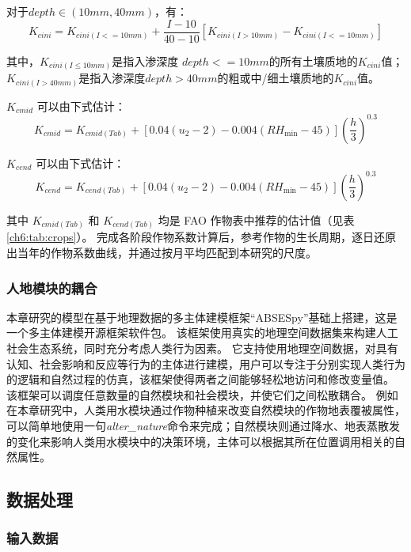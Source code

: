 对于$depth \in (10mm, 40mm)$，有：
\begin{equation}
    K_{c ini} = K_{c ini(I<=10mm)} + \frac{I-10}{40-10}[K_{c ini(I>10mm)} - K_{c ini(I<=10mm)}]
\end{equation}

其中，$K_{c ini(I≤10mm)}$是指入渗深度 $depth<=10 mm$的所有土壤质地的$K_{c ini}$值；$K_{c ini(I > 40 mm)}$是指入渗深度$depth>40 mm$的粗或中/细土壤质地的$K_{c ini}$值。

$K_{c mid}$ 可以由下式估计：
\begin{equation}
    K_{c mid} = K_{c mid(Tab)} + [0.04(u_2 - 2) -0.004(RH_{\min} - 45)]{(\frac{h}{3})}^{0.3}
\end{equation}

$K_{c end}$ 可以由下式估计：
\begin{equation}
    K_{c end} = K_{c end(Tab)} + [0.04(u_2 - 2) -0.004(RH_{\min} - 45)]{(\frac{h}{3})}^{0.3}
\end{equation}

其中 $K_{c mid(Tab)}$ 和 $K_{c end(Tab)}$ 均是 FAO 作物表中推荐的估计值（见表\ref{ch6:tab:crops}）。
完成各阶段作物系数计算后，参考作物的生长周期，逐日还原出当年的作物系数曲线，并通过按月平均匹配到本研究的尺度。

\subsubsection*{人地模块的耦合}

本章研究的模型在基于地理数据的多主体建模框架“ABSESpy”基础上搭建，这是一个多主体建模开源框架软件包。
该框架使用真实的地理空间数据集来构建人工社会生态系统，同时充分考虑人类行为因素。
它支持使用地理空间数据，对具有认知、社会影响和反应等行为的主体进行建模，用户可以专注于分别实现人类行为的逻辑和自然过程的仿真，该框架使得两者之间能够轻松地访问和修改变量值。
该框架可以调度任意数量的自然模块和社会模块，并使它们之间松散耦合。
例如在本章研究中，人类用水模块通过作物种植来改变自然模块的作物地表覆被属性，可以简单地使用一句\textit{alter\_nature}命令来完成；自然模块则通过降水、地表蒸散发的变化来影响人类用水模块中的决策环境，主体可以根据其所在位置调用相关的自然属性。

\subsection{数据处理}

\subsubsection*{输入数据}

